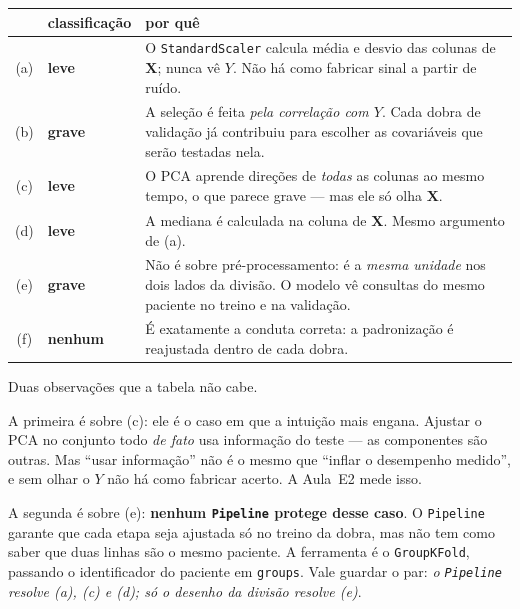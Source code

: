 \documentclass[11pt,a4paper]{article}
\begin{document}
\begin{solucao}
\begin{center}\small
\renewcommand{\arraystretch}{1.3}
\begin{tabular}{@{}clp{7.4cm}@{}}
\toprule
 & classificação & por quê \\
\midrule
(a) & \textbf{leve}    & O \texttt{StandardScaler} calcula média e desvio das colunas de $\bm X$; nunca vê $Y$. Não há como fabricar sinal a partir de ruído. \\
(b) & \textbf{grave}   & A seleção é feita \emph{pela correlação com $Y$}. Cada dobra de validação já contribuiu para escolher as covariáveis que serão testadas nela. \\
(c) & \textbf{leve}    & O PCA aprende direções de \emph{todas} as colunas ao mesmo tempo, o que parece grave --- mas ele só olha $\bm X$. \\
(d) & \textbf{leve}    & A mediana é calculada na coluna de $\bm X$. Mesmo argumento de (a). \\
(e) & \textbf{grave}   & Não é sobre pré-processamento: é a \emph{mesma unidade} nos dois lados da divisão. O modelo vê consultas do mesmo paciente no treino e na validação. \\
(f) & \textbf{nenhum}  & É exatamente a conduta correta: a padronização é reajustada dentro de cada dobra. \\
\bottomrule
\end{tabular}
\end{center}

Duas observações que a tabela não cabe.

A primeira é sobre (c): ele é o caso em que a intuição mais engana. Ajustar o PCA
no conjunto todo \emph{de fato} usa informação do teste --- as componentes são
outras. Mas ``usar informação'' não é o mesmo que ``inflar o desempenho medido'',
e sem olhar o $Y$ não há como fabricar acerto. A Aula~E2 mede isso.

A segunda é sobre (e): \textbf{nenhum \texttt{Pipeline} protege desse caso}. O
\texttt{Pipeline} garante que cada etapa seja ajustada só no treino da dobra, mas
não tem como saber que duas linhas são o mesmo paciente. A ferramenta é o
\texttt{GroupKFold}, passando o identificador do paciente em \texttt{groups}. Vale
guardar o par: \emph{o \texttt{Pipeline} resolve (a), (c) e (d); só o desenho da
divisão resolve (e)}.
\end{solucao}
\end{document}
